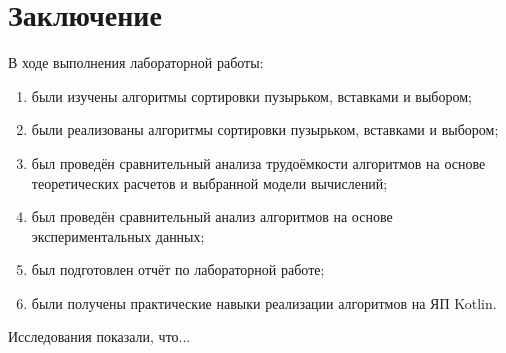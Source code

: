 \documentclass[12pt]{report}
\begin{document}
\chapter*{Заключение}
В ходе выполнения лабораторной работы:
\begin{enumerate}
\item были изучены алгоритмы сортировки пузырьком, вставками и выбором;
\item были реализованы алгоритмы сортировки пузырьком, вставками и выбором;
\item был проведён сравнительный анализа трудоёмкости алгоритмов на основе теоретических расчетов и выбранной модели вычислений;
\item был проведён сравнительный анализ алгоритмов на основе экспериментальных данных;
\item был подготовлен отчёт по лабораторной работе;
\item были получены практические навыки реализации алгоритмов на ЯП Kotlin.
\end{enumerate}

Исследования показали, что...

\end{document}
